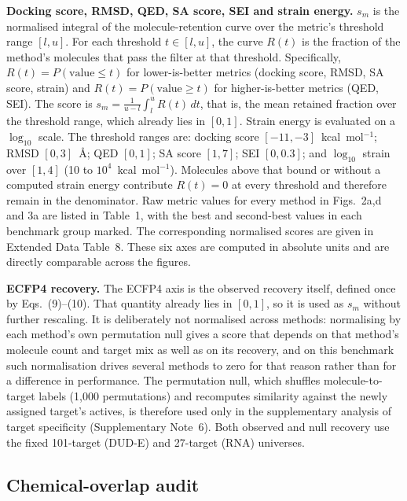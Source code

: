 \documentclass[pdflatex,sn-mathphys-num]{sn-jnl}
\theoremstyle{thmstyleone}
\theoremstyle{thmstyletwo}
\theoremstyle{thmstylethree}
\begin{document}
\medskip
\noindent\textbf{Docking score, RMSD, QED, SA score, SEI and strain energy.} $s_m$ is the normalised integral of the molecule-retention curve over the metric's threshold range $[l,u]$. For each threshold $t\in[l,u]$, the curve $R(t)$ is the fraction of the method's molecules that pass the filter at that threshold. Specifically, $R(t)=P(\text{value}\le t)$ for lower-is-better metrics (docking score, RMSD, SA score, strain) and $R(t)=P(\text{value}\ge t)$ for higher-is-better metrics (QED, SEI). The score is $s_m=\frac{1}{u-l}\int_l^u R(t)\,dt$, that is, the mean retained fraction over the threshold range, which already lies in $[0,1]$. Strain energy is evaluated on a $\log_{10}$ scale. The threshold ranges are: docking score $[-11,-3]$~kcal~mol$^{-1}$; RMSD $[0,3]$~\AA; QED $[0,1]$; SA score $[1,7]$; SEI $[0,0.3]$; and $\log_{10}$ strain over $[1,4]$ (10 to $10^{4}$~kcal~mol$^{-1}$). Molecules above that bound or without a computed strain energy contribute $R(t)=0$ at every threshold and therefore remain in the denominator. Raw metric values for every method in Figs.~2a,d and 3a are listed in Table~1, with the best and second-best values in each benchmark group marked. The corresponding normalised scores are given in Extended Data Table~8. These six axes are computed in absolute units and are directly comparable across the figures.

\medskip
\noindent\textbf{ECFP4 recovery.} The ECFP4 axis is the observed recovery itself, defined once by Eqs.~(9)--(10). That quantity already lies in $[0,1]$, so it is used as $s_m$ without further rescaling. It is deliberately not normalised across methods: normalising by each method's own permutation null gives a score that depends on that method's molecule count and target mix as well as on its recovery, and on this benchmark such normalisation drives several methods to zero for that reason rather than for a difference in performance. The permutation null, which shuffles molecule-to-target labels (1,000 permutations) and recomputes similarity against the newly assigned target's actives, is therefore used only in the supplementary analysis of target specificity (Supplementary Note~6). Both observed and null recovery use the fixed 101-target (DUD-E) and 27-target (RNA) universes.

\subsection{Chemical-overlap audit}\label{overlap_audit_methods}
\end{document}
